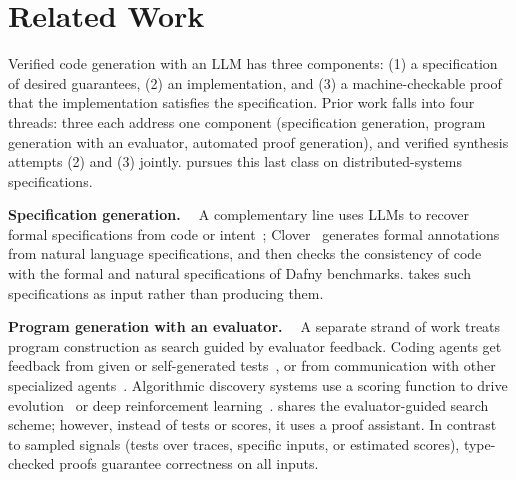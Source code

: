 \section{Related Work}
\label{sec:related}

Verified code generation with an LLM has three components: (1) a specification of desired guarantees, (2) an implementation, and (3) a machine-checkable proof that the implementation satisfies the specification. Prior work falls into four threads: three each address one component (specification generation, program generation with an evaluator, automated proof generation), and verified synthesis attempts (2) and (3) jointly. \sys{} pursues this last class on distributed-systems specifications.

\textbf{Specification generation. \ }
A complementary line uses LLMs to recover formal specifications from code or intent~\cite{nl2postcond,autospec};
Clover~\cite{clover} generates formal annotations from natural language specifications, and then checks the consistency of code with the formal and natural specifications of Dafny benchmarks.
\sys{} takes such specifications as input rather than producing them.


\textbf{Program generation with an evaluator. \ }
% 
A separate strand of work treats program construction as search guided by evaluator feedback. 
Coding agents get feedback from given or self-generated tests~\cite{swe-agent,reflexion},
or from communication with other specialized agents~\cite{metagpt,chatdev,autogen}.
% 
Algorithmic discovery systems use a scoring function to drive evolution~\cite{funsearch,alphaevolve} or deep reinforcement learning~\cite{alphadev}. 
% 
\sys{} shares the evaluator-guided search scheme;
however, instead of tests or scores, it uses a proof assistant.
In contrast to sampled signals (tests over traces, specific inputs, or estimated scores),
type-checked proofs guarantee correctness on all inputs.


